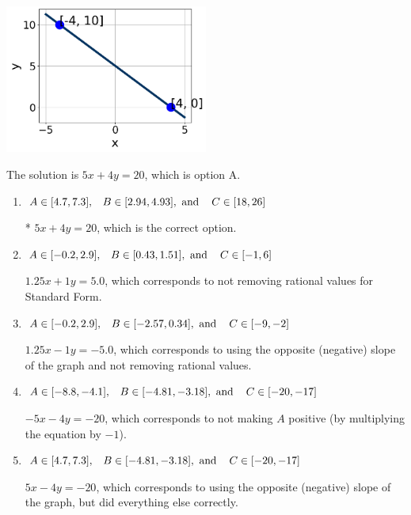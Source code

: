 \documentclass{extbook}[14pt]
\begin{document}
\begin{enumerate}
{\begin{center}
    \includegraphics[width=0.5\textwidth]{../Figures/linearGraphToStandardCopyB.png}
\end{center}


The solution is \( 5x + 4y = 20 \), which is option A.\begin{enumerate}[label=\Alph*.]
\item \( A \in [4.7, 7.3], \hspace{3mm} B \in [2.94, 4.93], \text{ and } \hspace{3mm} C \in [18, 26] \)

* $5x + 4y = 20$, which is the correct option.
\item \( A \in [-0.2, 2.9], \hspace{3mm} B \in [0.43, 1.51], \text{ and } \hspace{3mm} C \in [-1, 6] \)

 $1.25x + 1y = 5.0$, which corresponds to not removing rational values for Standard Form.
\item \( A \in [-0.2, 2.9], \hspace{3mm} B \in [-2.57, 0.34], \text{ and } \hspace{3mm} C \in [-9, -2] \)

 $1.25x - 1y = -5.0$, which corresponds to using the opposite (negative) slope of the graph and not removing rational values.
\item \( A \in [-8.8, -4.1], \hspace{3mm} B \in [-4.81, -3.18], \text{ and } \hspace{3mm} C \in [-20, -17] \)

 $-5x - 4y = -20$, which corresponds to not making $A$ positive (by multiplying the equation by $-1$).
\item \( A \in [4.7, 7.3], \hspace{3mm} B \in [-4.81, -3.18], \text{ and } \hspace{3mm} C \in [-20, -17] \)

 $5x - 4y = -20$, which corresponds to using the opposite (negative) slope of the graph, but did everything else correctly.
\end{enumerate}

}
\end{enumerate}
\end{document}
